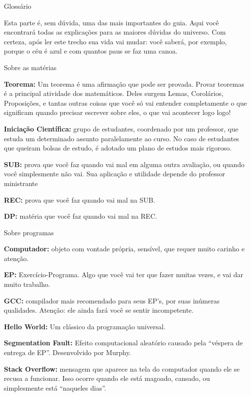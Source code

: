 \begin{secao}{Glossário}

Esta parte é, sem dúvida, uma das mais importantes do guia. Aqui você
encontrará todas as explicações para as maiores dúvidas do universo. Com
certeza, após ler este trecho sua vida vai mudar: você saberá, por exemplo,
porque o céu é azul e com quantos paus se faz uma canoa.

\begin{subsecao}{Sobre as matérias}

{\bf Teorema:} Um teorema é uma afirmação que pode ser provada. Provar
teoremas é a principal atividade dos matemáticos. Deles surgem Lemas,
Corolários, Proposições, e tantas outras coisas que você só vai entender
completamente o que significam quando precisar escrever sobre eles, o que vai
acontecer logo logo!

{\bf Iniciação Científica:} grupo de estudantes, coordenado por um professor, que
estuda um determinado assunto paralelamente ao curso. No caso de estudantes que
queiram bolsas de estudo, é adotado um plano de estudos mais rigoroso.

{\bf SUB:} prova que você faz quando vai mal em alguma outra avaliação, ou
quando você simplesmente não vai. Sua aplicação e utilidade depende do
professor ministrante

{\bf REC:} prova que você faz quando vai mal na SUB.

{\bf DP:} matéria que você faz quando vai mal na REC.
\end{subsecao}

\begin{subsecao}{Sobre programas}

{\bf Computador:} objeto com vontade própria, sensível, que requer muito
carinho e atenção.

{\bf EP:} Exercício-Programa. Algo que você vai ter que fazer muitas vezes, e
vai dar muito trabalho.

{\bf GCC:} compilador mais recomendado para seus EP's, por suas inúmeras
qualidades. Atenção: ele ainda fará você se sentir incompetente.

{\bf Hello World:} Um clássico da programação universal.

{\bf Segmentation Fault:} Efeito computacional aleatório causado pela ``véspera
de entrega de EP''. Desenvolvido por Murphy.

{\bf Stack Overflow:} mensagem que aparece na tela do computador
quando ele se recusa a funcionar. Isso ocorre quando ele está magoado, cansado,
ou simplesmente está ``naqueles dias''.


\end{subsecao}
\end{secao}
